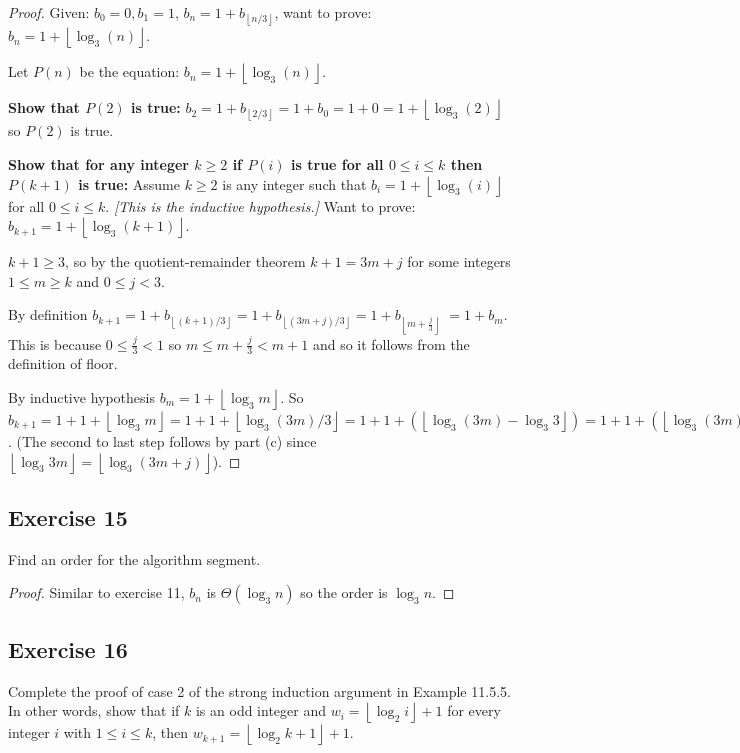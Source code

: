 \documentclass[14pt]{extarticle}
\newcommand{\floor}[1]{{\left\lfloor#1\right\rfloor}}
\begin{document}
\begin{proof}
Given: \(b_0 = 0, b_1 = 1\), \(b_n = 1 + b_{\floor{n/3}}\), want to prove: \(b_n = 1 + \floor{\log_3(n)}\).

Let \(P(n)\) be the equation: \(b_n = 1 + \floor{\log_3(n)}\).

{\bf Show that \(P(2)\) is true:} \(b_2 = 1 + b_{\floor{2/3}} = 1 + b_0 = 1 + 0 = 1 + \floor{\log_3(2)}\) so \(P(2)\) is 
true.

{\bf Show that for any integer \(k \geq 2\) if \(P(i)\) is true for all \(0 \leq i \leq k\) then \(P(k+1)\) is true:}
Assume \(k \geq 2\) is any integer such that \(b_i = 1 + \floor{\log_3(i)}\) for all \(0 \leq i \leq k\). {\it [This 
is the inductive hypothesis.]} Want to prove: \(b_{k+1} = 1 + \floor{\log_3(k+1)}\).

\(k+1 \geq 3\), so by the quotient-remainder theorem \(k+1 = 3m+j\) for some integers \(1\leq m\geq k\) and \(0\leq j< 3\).

By definition \(b_{k+1} = 1 + b_{\floor{(k+1)/3}} = 1 + b_{\floor{(3m+j)/3}} = 1 + b_{\floor{m + \frac{j}{3}}}\)
\( = 1 + b_m\). This is because \(0 \leq \frac{j}{3} < 1\) so \(m \leq m+\frac{j}{3} < m+1\) and so it follows from the 
definition of floor.

By inductive hypothesis \(b_m = 1 + \floor{\log_3 m}\). So \(b_{k+1} = 1 + 1 + \floor{\log_3 m} = 1 + 1 + \floor{\log_3 
(3m)/3} = 1 + 1 + (\floor{\log_3 (3m) - \log_3 3}) = 1 + 1 + (\floor{\log_3 (3m) - 1}) = 1 + 1 + \floor{\log_3 (3m)} - 1)
= 1 + \floor{\log_3(3m)} = 1 + \floor{\log_3(3m + j)} = 1 + \floor{\log_3 (k+1)}\). (The second to last step follows by part (c) since \(\floor{\log_3 3m} = \floor{\log_3(3m+j)}\)).
\end{proof}

\subsection{Exercise 15}
Find an order for the algorithm segment.

\begin{proof}
Similar to exercise 11, \(b_n\) is \(\Theta(\log_3 n)\) so the order is \(\log_3 n\).
\end{proof}

\subsection{Exercise 16}
Complete the proof of case 2 of the strong induction argument in Example 11.5.5. In other words, show that if \(k\) is an 
odd integer and \(w_i = \floor{\log_2 i} + 1\) for every integer \(i\) with \(1 \leq i \leq k\), then \(w_{k+1} = 
\floor{\log_2 k + 1} + 1\).
\end{document}
